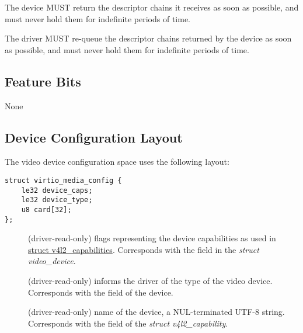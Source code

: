 
The device MUST return the descriptor chains it receives as soon as
possible, and must never hold them for indefinite periods of time.


The driver MUST re-queue the descriptor chains returned by the device as soon
as possible, and must never hold them for indefinite periods of time.

\subsection{Feature Bits}\label{sec:Device Types / Media Device / Feature Bits}

None

\subsection{Device Configuration Layout}\label{sec:Device Types / Media Device / Device Configuration Layout}

The video device configuration space uses the following layout:

\begin{lstlisting}
struct virtio_media_config {
    le32 device_caps;
    le32 device_type;
    u8 card[32];
};
\end{lstlisting}

\begin{description}
\item[] (driver-read-only) flags representing the device
capabilities as used in
\href{https://www.kernel.org/doc/html/v4.9/media/uapi/v4l/vidioc-querycap.html#c.v4l2_capability}{struct v4l2_capabilities}.
Corresponds with the  field in the \textit{struct video_device}.
\item[] (driver-read-only) informs the driver of the type
of the video device. Corresponds with the  field of the device.
\item[] (driver-read-only) name of the device, a NUL-terminated
UTF-8 string. Corresponds with the  field of the \textit{struct v4l2_capability}.
\end{description}

